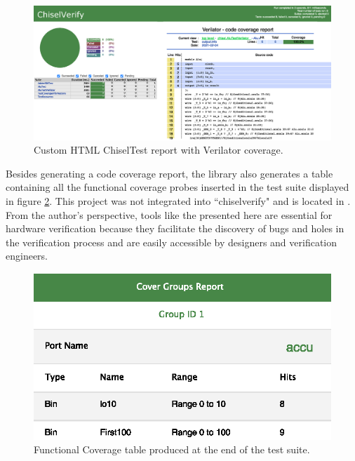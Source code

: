 \begin{figure}[!ht]
\centering
\includegraphics[width=\linewidth]{pictures/Chiselverify_html.eps}
\caption{Custom HTML ChiselTest report with Verilator coverage.}
\label{fig:customhtmlreport}
\end{figure}

Besides generating a code coverage report, the library also generates a table
containing all the functional coverage probes inserted in the test suite
displayed in figure \ref{fig:functionalcoveragebins}. This project was not
integrated into ``chiselverify" and is located in \cite{github:coverage}. From
the author's perspective, tools like the presented here are essential for
hardware verification because they facilitate the discovery of bugs and holes in
the verification process and are easily accessible by designers and verification
engineers.


\begin{figure}[!ht]
\centering
\includegraphics[width=0.4\linewidth]{pictures/Coverage_table.eps}
\caption{Functional Coverage table produced at the end of the test suite.}
\label{fig:functionalcoveragebins}
\end{figure}
